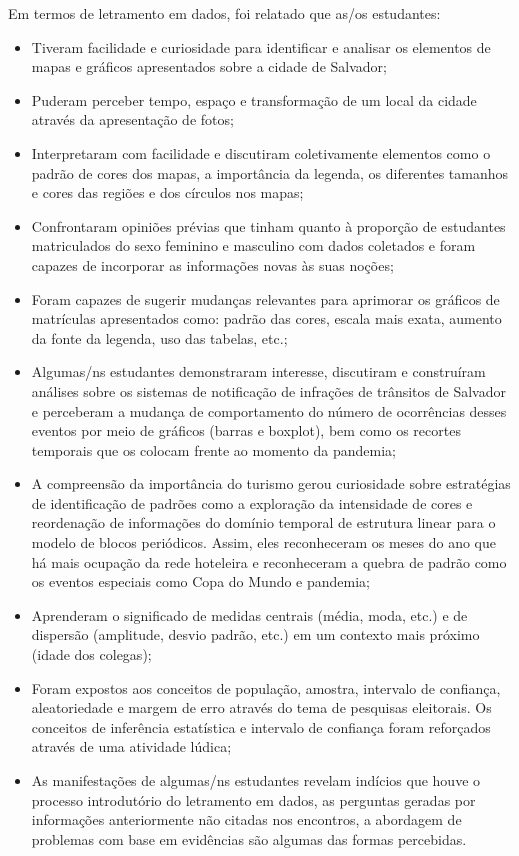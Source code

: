 \documentclass[
]{book}
\providecommand{\tightlist}{%
  \setlength{\itemsep}{0pt}\setlength{\parskip}{0pt}}
\begin{document}
Em termos de letramento em dados, foi relatado que as/os estudantes:

\begin{itemize}
\tightlist
\item
  Tiveram facilidade e curiosidade para identificar e analisar os elementos de mapas e gráficos apresentados sobre a cidade de Salvador;
\item
  Puderam perceber tempo, espaço e transformação de um local da cidade através da apresentação de fotos;
\item
  Interpretaram com facilidade e discutiram coletivamente elementos como o padrão de cores dos mapas, a importância da legenda, os diferentes tamanhos e cores das regiões e dos círculos nos mapas;
\item
  Confrontaram opiniões prévias que tinham quanto à proporção de estudantes matriculados do sexo feminino e masculino com dados coletados e foram capazes de incorporar as informações novas às suas noções;
\item
  Foram capazes de sugerir mudanças relevantes para aprimorar os gráficos de matrículas apresentados como: padrão das cores, escala mais exata, aumento da fonte da legenda, uso das tabelas, etc.;
\item
  Algumas/ns estudantes demonstraram interesse, discutiram e construíram análises sobre os sistemas de notificação de infrações de trânsitos de Salvador e perceberam a mudança de comportamento do número de ocorrências desses eventos por meio de gráficos (barras e boxplot), bem como os recortes temporais que os colocam frente ao momento da pandemia;
\item
  A compreensão da importância do turismo gerou curiosidade sobre estratégias de identificação de padrões como a exploração da intensidade de cores e reordenação de informações do domínio temporal de estrutura linear para o modelo de blocos periódicos. Assim, eles reconheceram os meses do ano que há mais ocupação da rede hoteleira e reconheceram a quebra de padrão como os eventos especiais como Copa do Mundo e pandemia;
\item
  Aprenderam o significado de medidas centrais (média, moda, etc.) e de dispersão (amplitude, desvio padrão, etc.) em um contexto mais próximo (idade dos colegas);
\item
  Foram expostos aos conceitos de população, amostra, intervalo de confiança, aleatoriedade e margem de erro através do tema de pesquisas eleitorais. Os conceitos de inferência estatística e intervalo de confiança foram reforçados através de uma atividade lúdica;
\item
  As manifestações de algumas/ns estudantes revelam indícios que houve o processo introdutório do letramento em dados, as perguntas geradas por informações anteriormente não citadas nos encontros, a abordagem de problemas com base em evidências são algumas das formas percebidas.
\end{itemize}
\end{document}
